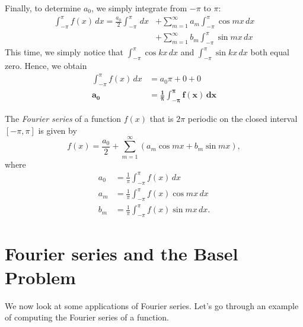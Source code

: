 \documentclass{amsart}
\begin{document}
  Finally, to determine $a_0$, we simply integrate from $-\pi$ to $\pi$:
  \begin{align*}
    \int_{-\pi}^{\pi} f(x)\, dx = \frac{a_0}{2} \int_{-\pi}^{\pi} \, dx &+ \sum_{m=1}^{\infty} a_m \int_{-\pi}^{\pi} \cos mx\, dx \\
                                &+ \sum_{m=1}^{\infty} b_m \int_{-\pi}^{\pi} \sin mx\, dx 
  \end{align*}
  This time, we simply notice that $\int_{-\pi}^{\pi} \cos kx\, dx $ and $\int_{-\pi}^{\pi} \sin kx\, dx$ both equal zero. Hence, we obtain 
  \begin{align*}
    \int_{-\pi}^{\pi} f(x) \, dx &= a_0 \pi + 0 + 0 \\
    \bm{a_0} &\bm{= \frac{1}{\pi} \int_{-\pi}^{\pi} f(x) \, dx} 
  \end{align*}
  \begin{definition}
    The \emph{Fourier series} of a function $f(x)$ that is $2\pi$ periodic on the closed interval  $[-\pi, \pi]$ is given by \[
      f(x) = \frac{a_0}{2} + \sum_{m=1}^{\infty} (a_m \cos mx + b_m \sin mx)
    ,\] where 
    \begin{align*}
      a_0 &= \frac{1}{\pi}\int_{-\pi}^{\pi} f(x)\, dx \\
      a_m &= \frac{1}{\pi}\int_{-\pi}^{\pi} f(x)\cos mx\, dx \\
      b_m &= \frac{1}{\pi}\int_{-\pi}^{\pi} f(x)\sin mx\, dx.
    \end{align*}
  \end{definition}

  \section{Fourier series and the Basel Problem}

  We now look at some applications of Fourier series. Let's go through an example of computing the Fourier series of a function.
\end{document}
